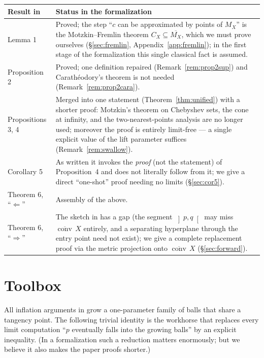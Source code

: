 \documentclass[11pt]{article}
\theoremstyle{remark}
\newcommand{\X}{X}
\newcommand{\conv}{\operatorname{conv}}
\newcommand{\cconv}[1]{\overline{\conv}\,#1}
\newcommand{\Mx}{M_{\X}}
\newcommand{\Cx}{C_{\X}}
\begin{document}
\begin{center}
\renewcommand{\arraystretch}{1.25}
\begin{tabular}{p{}p{}}
\hline
Result in \cite{Bia} & Status in the formalization \\
\hline
Lemma 1 & Proved; the step ``$c$ can be approximated by points of $\Mx$'' is the
Motzkin--Fremlin theorem $\Cx\subseteq\overline{\Mx}$, which we must prove ourselves
(\S\ref{sec:fremlin}, Appendix~\ref{app:fremlin}); in the first stage of the formalization this
single classical fact is assumed.\\
Proposition 2 & Proved; one definition repaired (Remark~\ref{rem:prop2sup}) and Carath\'eodory's
theorem is not needed (Remark~\ref{rem:prop2cara}).\\
Propositions 3, 4 & Merged into one statement (Theorem~\ref{thm:unified}) with a shorter proof:
Motzkin's theorem on Chebyshev sets, the cone at infinity, and the two-nearest-points analysis
are no longer used; moreover the proof is entirely limit-free — a single explicit value of the
lift parameter suffices (Remark~\ref{rem:swallow}).\\
Corollary 5 & As written it invokes the \emph{proof} (not the statement) of Proposition~4 and
does not literally follow from it; we give a direct ``one-shot'' proof needing no limits
(\S\ref{sec:cor5}).\\
Theorem 6, ``$\Leftarrow$'' & Assembly of the above. \\
Theorem 6, ``$\Rightarrow$'' & The sketch in \cite{Bia} has a gap (the segment
$\left]p,q\right[$ may miss $\cconv\X$ entirely, and a separating hyperplane through the entry
point need not exist); we give a complete replacement proof via the metric projection onto
$\cconv \X$ (\S\ref{sec:forward}).\\
\hline
\end{tabular}
\end{center}

\section{Toolbox}\label{sec:toolbox}

All inflation arguments in \cite{Bia} grow a one-parameter family of balls that share a tangency
point. The following trivial identity is the workhorse that replaces every limit computation
``$p$ eventually falls into the growing balls'' by an explicit inequality. (In a formalization
such a reduction matters enormously; but we believe it also makes the paper proofs shorter.)
\end{document}
